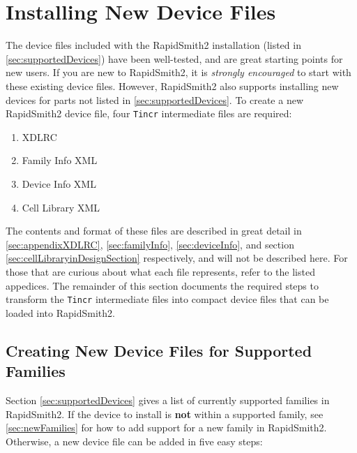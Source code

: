 \newpage
\section{Installing New Device Files} \label{sec:installingNewDevices}
\graphicspath{{./techReportFigures/sec10_deviceInstallation/}}

The device files included with the RapidSmith2 installation (listed in
\autoref{sec:supportedDevices}) have been well-tested, and are great starting
points for new users. If you are new to RapidSmith2, it is \textit{strongly
encouraged} to start with these existing device files. However, RapidSmith2
also supports installing new devices for parts not listed in
\autoref{sec:supportedDevices}. To create a new RapidSmith2 device
file, four \texttt{Tincr} intermediate files are required:

\begin{enumerate}
  \item XDLRC
  \item Family Info XML
  \item Device Info XML
  \item Cell Library XML
\end{enumerate}

\noindent The contents and format of these files are described in
great detail in \autoref{sec:appendixXDLRC}, \autoref{sec:familyInfo},
\autoref{sec:deviceInfo}, and section \ref{sec:cellLibraryinDesignSection}
respectively, and will not be described here. For those that are curious about
what each file represents, refer to the listed appedices. The remainder of this
section documents the required steps to transform the \texttt{Tincr}
intermediate files into compact device files that can be loaded into
RapidSmith2.

\subsection{Creating New Device Files for Supported Families}
\label{sec:creatingNewSupportedDevices} 
Section \ref{sec:supportedDevices} gives a list of currently supported
families in RapidSmith2. If the device to install is \textbf{not} within a
supported family, see \autoref{sec:newFamilies} for how to add support for a
new family in RapidSmith2. Otherwise, a new device file can be added in five
easy steps:

